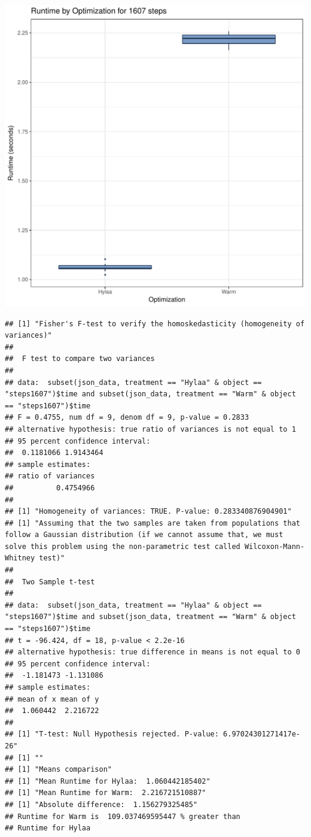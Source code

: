 \documentclass{article}\usepackage[]{graphicx}\usepackage[]{color}
\makeatletter
\def\maxwidth{ %
  \ifdim\Gin@nat@width>\linewidth
    \linewidth
  \else
    \Gin@nat@width
  \fi
}
\newenvironment{kframe}{%
 \def\at@end@of@kframe{}%
 \ifinner\ifhmode%
  \def\at@end@of@kframe{\end{minipage}}%
  \begin{minipage}{\columnwidth}%
 \fi\fi%
 \def\FrameCommand##1{\hskip\@totalleftmargin \hskip-\fboxsep
 \colorbox{shadecolor}{##1}\hskip-\fboxsep
     \hskip-\linewidth \hskip-\@totalleftmargin \hskip\columnwidth}%
 \MakeFramed {\advance\hsize-\width
   \@totalleftmargin\z@ \linewidth\hsize
   \@setminipage}}%
 {\par\unskip\endMakeFramed%
 \at@end@of@kframe}
\newenvironment{knitrout}{}{} %
\makeatother
\begin{document}
\begin{knitrout}
\color{fgcolor}
\includegraphics[width=\maxwidth]{figure/RH1_steps1607-1} 
\begin{kframe}\begin{verbatim}
## [1] "Fisher's F-test to verify the homoskedasticity (homogeneity of variances)"
## 
## 	F test to compare two variances
## 
## data:  subset(json_data, treatment == "Hylaa" & object == "steps1607")$time and subset(json_data, treatment == "Warm" & object == "steps1607")$time
## F = 0.4755, num df = 9, denom df = 9, p-value = 0.2833
## alternative hypothesis: true ratio of variances is not equal to 1
## 95 percent confidence interval:
##  0.1181066 1.9143464
## sample estimates:
## ratio of variances 
##          0.4754966 
## 
## [1] "Homogeneity of variances: TRUE. P-value: 0.283340876904901"
## [1] "Assuming that the two samples are taken from populations that follow a Gaussian distribution (if we cannot assume that, we must solve this problem using the non-parametric test called Wilcoxon-Mann-Whitney test)"
## 
## 	Two Sample t-test
## 
## data:  subset(json_data, treatment == "Hylaa" & object == "steps1607")$time and subset(json_data, treatment == "Warm" & object == "steps1607")$time
## t = -96.424, df = 18, p-value < 2.2e-16
## alternative hypothesis: true difference in means is not equal to 0
## 95 percent confidence interval:
##  -1.181473 -1.131086
## sample estimates:
## mean of x mean of y 
##  1.060442  2.216722 
## 
## [1] "T-test: Null Hypothesis rejected. P-value: 6.97024301271417e-26"
## [1] ""
## [1] "Means comparison"
## [1] "Mean Runtime for Hylaa:  1.060442185402"
## [1] "Mean Runtime for Warm:  2.216721510887"
## [1] "Absolute difference:  1.156279325485"
## Runtime for Warm is  109.037469595447 % greater than 
## Runtime for Hylaa
\end{verbatim}
\end{kframe}
\end{knitrout}
\end{document}
